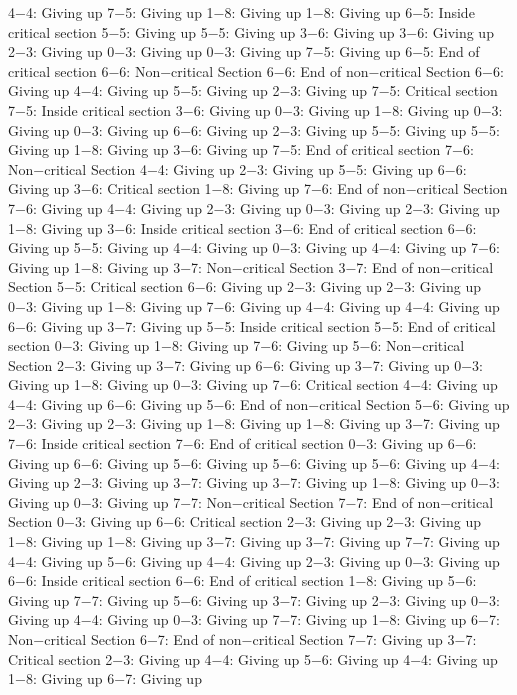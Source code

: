 4−4: Giving up
7−5: Giving up
1−8: Giving up
1−8: Giving up
6−5: Inside critical section
5−5: Giving up
5−5: Giving up
3−6: Giving up
3−6: Giving up
2−3: Giving up
0−3: Giving up
0−3: Giving up
7−5: Giving up
6−5: End of critical section
6−6: Non−critical Section
6−6: End of non−critical Section
6−6: Giving up
4−4: Giving up
5−5: Giving up
2−3: Giving up
7−5: Critical section
7−5: Inside critical section
3−6: Giving up
0−3: Giving up
1−8: Giving up
0−3: Giving up
0−3: Giving up
6−6: Giving up
2−3: Giving up
5−5: Giving up
5−5: Giving up
1−8: Giving up
3−6: Giving up
7−5: End of critical section
7−6: Non−critical Section
4−4: Giving up
2−3: Giving up
5−5: Giving up
6−6: Giving up
3−6: Critical section
1−8: Giving up
7−6: End of non−critical Section
7−6: Giving up
4−4: Giving up
2−3: Giving up
0−3: Giving up
2−3: Giving up
1−8: Giving up
3−6: Inside critical section
3−6: End of critical section
6−6: Giving up
5−5: Giving up
4−4: Giving up
0−3: Giving up
4−4: Giving up
7−6: Giving up
1−8: Giving up
3−7: Non−critical Section
3−7: End of non−critical Section
5−5: Critical section
6−6: Giving up
2−3: Giving up
2−3: Giving up
0−3: Giving up
1−8: Giving up
7−6: Giving up
4−4: Giving up
4−4: Giving up
6−6: Giving up
3−7: Giving up
5−5: Inside critical section
5−5: End of critical section
0−3: Giving up
1−8: Giving up
7−6: Giving up
5−6: Non−critical Section
2−3: Giving up
3−7: Giving up
6−6: Giving up
3−7: Giving up
0−3: Giving up
1−8: Giving up
0−3: Giving up
7−6: Critical section
4−4: Giving up
4−4: Giving up
6−6: Giving up
5−6: End of non−critical Section
5−6: Giving up
2−3: Giving up
2−3: Giving up
1−8: Giving up
1−8: Giving up
3−7: Giving up
7−6: Inside critical section
7−6: End of critical section
0−3: Giving up
6−6: Giving up
6−6: Giving up
5−6: Giving up
5−6: Giving up
5−6: Giving up
4−4: Giving up
2−3: Giving up
3−7: Giving up
3−7: Giving up
1−8: Giving up
0−3: Giving up
0−3: Giving up
7−7: Non−critical Section
7−7: End of non−critical Section
0−3: Giving up
6−6: Critical section
2−3: Giving up
2−3: Giving up
1−8: Giving up
1−8: Giving up
3−7: Giving up
3−7: Giving up
7−7: Giving up
4−4: Giving up
5−6: Giving up
4−4: Giving up
2−3: Giving up
0−3: Giving up
6−6: Inside critical section
6−6: End of critical section
1−8: Giving up
5−6: Giving up
7−7: Giving up
5−6: Giving up
3−7: Giving up
2−3: Giving up
0−3: Giving up
4−4: Giving up
0−3: Giving up
7−7: Giving up
1−8: Giving up
6−7: Non−critical Section
6−7: End of non−critical Section
7−7: Giving up
3−7: Critical section
2−3: Giving up
4−4: Giving up
5−6: Giving up
4−4: Giving up
1−8: Giving up
6−7: Giving up

